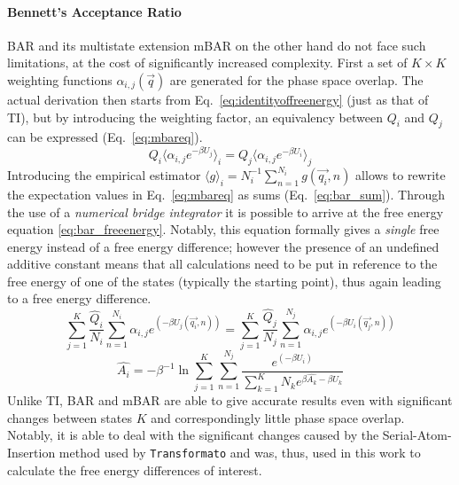 \documentclass[oneside]{scrreprt}
\begin{document}
\paragraph{Bennett's Acceptance Ratio} BAR and its multistate extension mBAR on the other hand do not face such limitations, at the cost of significantly increased complexity. First a set of $K \times K$ weighting functions $\alpha_{i,j} (\Vec{q})$ are generated for the phase space overlap. The actual derivation then starts from Eq.~\ref{eq:identityoffreenergy} (just as that of TI), but by introducing the weighting factor, an equivalency between $Q_i$ and $Q_j$ can be expressed (Eq.~\ref{eq:mbareq}).
\begin{equation} \label{eq:mbareq}
    Q_i\langle \alpha_{i,j} e^{-\beta U_j}\rangle_i = Q_j \langle \alpha_{i,j} e^{-\beta U_i} \rangle_j
\end{equation}
Introducing the empirical estimator $\langle g \rangle_i = N_i^{-1} \sum_{n=1}^{N_i} g(\Vec{q_i},n)$ allows to rewrite the expectation values in Eq.~\ref{eq:mbareq} as sums (Eq.~\ref{eq:bar_sum}). Through the use of a \emph{numerical bridge integrator} \cite{tan_likelihood_2004} it is possible to arrive at the free energy equation \ref{eq:bar_freeenergy}. Notably, this equation formally gives a \emph{single} free energy instead of a free energy difference; however the presence of an undefined additive constant means that all calculations need to be put in reference to the free energy of one of the states (typically the starting point), thus again leading to a free energy difference.
\begin{equation} \label{eq:bar_sum}
    \sum^K_{j=1}\frac{\hat{Q}_i}{N_i} \sum_{n=1}^{N_i} \alpha_{i,j} e^{(-\beta U_j(\Vec{q_i},n))} = \sum^K_{j=1}\frac{\hat{Q}_j}{N_j} \sum_{n=1}^{N_j} \alpha_{i,j} e^{(-\beta U_i(\Vec{q_j},n))}
\end{equation}
\begin{equation} \label{eq:bar_freeenergy}
\hat{A_i}= -\beta^{-1} \ln{\sum^K_{j=1} \sum^{N_j}_{n=1}\frac{e^{(-\beta U_i)}}{\sum^K_{k=1} N_k e^{\beta \hat{A_k}-\beta U_k}}}   
\end{equation}
Unlike TI, BAR and mBAR are able to give accurate results even with significant changes between states $K$ and correspondingly little phase space overlap. Notably, it is able to deal with the significant changes caused by the Serial-Atom-Insertion method used by \texttt{Transformato} and was, thus, used in this work to calculate the free energy differences of interest.
\end{document}
